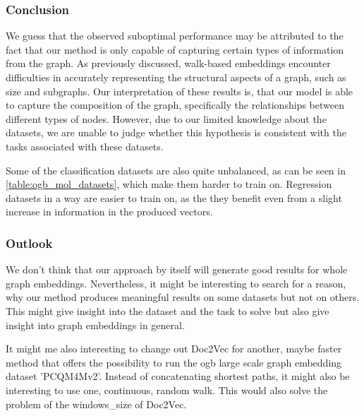 \subsubsection{Conclusion}
We guess that the observed suboptimal performance may be attributed to the fact that our method is only capable of capturing certain types of information from the graph. As previously discussed, walk-based embeddings encounter difficulties in accurately representing the structural aspects of a graph, such as size and subgraphs. Our interpretation of these results is, that our model is able to capture the composition of the graph, specifically the relationships between different types of nodes. However, due to our limited knowledge about the datasets, we are unable to judge whether this hypothesis is consistent with the tasks associated with these datasets.

Some of the classification datasets are also quite unbalanced, as can be seen in \autoref{table:ogb_mol_datasets}, which make them harder to train on. Regression datasets in a way are easier to train on, as the they benefit even from a slight increase in information in the produced vectors.

\subsubsection{Outlook}
We don't think that our approach by itself will generate good results for whole graph embeddings. Nevertheless, it might be interesting to search for a reason, why our method produces meaningful results on some datasets but not on others. This might give insight into the dataset and the task to solve but also give insight into graph embeddings in general.

It might me also interesting to change out Doc2Vec for another, maybe faster method that offers the possibility to run the ogb large scale graph embedding dataset 'PCQM4Mv2'. Instead of concatenating shortest paths, it might also be interesting to use one, continuous, random walk. This would also solve the problem of the windows\_size of Doc2Vec.

